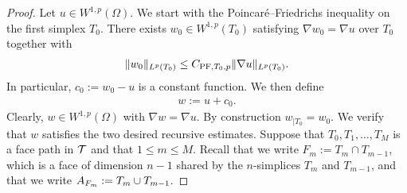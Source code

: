 \documentclass[10pt,a4paper]{article}
\begin{document}
\begin{proof}
    Let $u \in W^{1,p}(\Omega)$. 
    We start with the Poincar\'e--Friedrichs inequality on the first simplex $T_{0}$. 
    There exists $w_0 \in W^{1,p}(T_{0})$ satisfying $\nabla w_0 = \nabla u$ over $T_{0}$ together with 
    \begin{gather*}
        \| w_0 \|_{L^{p}(T_{0})} \leq C_{{{\rm PF}},T_{0},p} \| \nabla u \|_{L^{p}(T_{0})}.
    \end{gather*}
    In particular, $c_{0} := w_0 - u$ is a constant function. 
    We then define 
    \begin{align*}
        w := u + c_0
        .
    \end{align*} 
    Clearly, $w \in W^{1,p}(\Omega)$ with $\nabla w = \nabla u$.
    By construction $w_{|T_{0}} = w_0$. 
    We verify that $w$ satisfies the two desired recursive estimates.
    Suppose that $T_0, T_1, \dots, T_M$ is a face path in ${\mathcal T}$
    and that $1 \leq m \leq M$.
    Recall that we write $F_m := T_m \cap T_{m-1}$, which is a face of dimension $n-1$ shared by the $n$-simplices $T_{m}$ and $T_{m-1}$,
    and that we write $A_{F_m} := T_m \cup T_{m-1}$. 
    

\end{proof}
\end{document}
